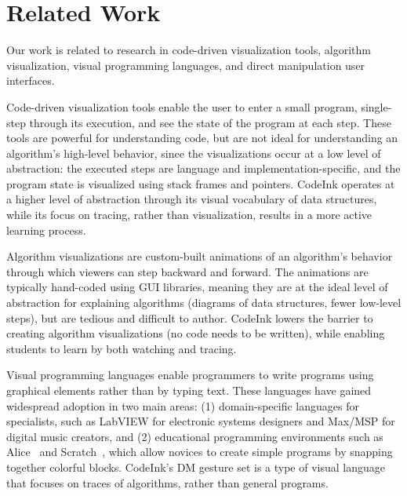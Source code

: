 \section{Related Work}

Our work is related to research in code-driven visualization tools, algorithm
visualization, visual programming languages, and direct manipulation user
interfaces.

Code-driven visualization tools enable the user to enter a small program,
single-step through its execution, and see the state of the program at each
step. These tools are powerful for understanding code, but are not ideal for
understanding an algorithm's high-level behavior, since the visualizations occur
at a low level of abstraction: the executed steps are language and
implementation-specific, and the program state is visualized using stack frames
and pointers. CodeInk operates at a higher level of abstraction through its
visual vocabulary of data structures, while its focus on tracing, rather than
visualization, results in a more active learning process.


Algorithm visualizations are custom-built animations of an algorithm's behavior
through which viewers can step backward and forward. The animations are
typically hand-coded using GUI libraries, meaning they are at the ideal level of
abstraction for explaining algorithms (diagrams of data structures, fewer
low-level steps), but are tedious and difficult to author.
CodeInk lowers the barrier to creating algorithm visualizations (no code needs
to be written), while enabling students to learn by both watching and
tracing.



Visual programming languages enable programmers to write programs using
graphical elements rather than by typing text. These languages have gained
widespread adoption in two main areas:
(1) domain-specific languages for specialists, such as LabVIEW for electronic
systems designers and Max/MSP for digital music creators, and (2) educational
programming environments such as Alice~\cite{Alice2008} and
Scratch~\cite{Scratch2008}, which allow novices to create simple programs by
snapping together colorful blocks. CodeInk's DM gesture set is a type of visual
language that focuses on traces of algorithms, rather than general
programs.

